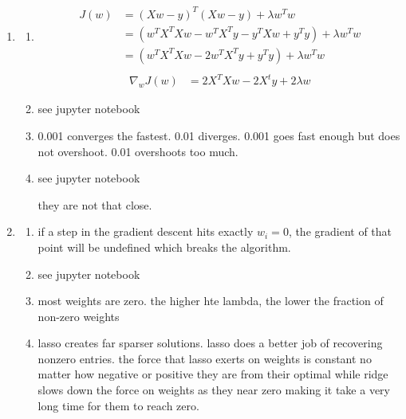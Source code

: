 \documentclass{article}
\begin{document}
\section{}
\begin{enumerate}
    \item 
    \begin{enumerate}
        \item \begin{equation}\begin{split}
            J(w) &= (Xw - y)^T (Xw - y) + {\lambda} w^T w\\
            &=  (w^T X^T X w - w^T X^T y - y^T X w + y^T y) + {\lambda}{} w^T w\\
            &=  (w^T X^T X w - 2w^T X^T y + y^T y) + {\lambda}{} w^T w\\
        \end{split}
        \end{equation}
        \begin{equation}\begin{split}
            \nabla_w J(w)&= 2X^TX w - 2X^ty + 2\lambda w
        \end{split}
        \end{equation}
        \item see jupyter notebook
        \item 0.001 converges the fastest. 0.01 diverges. 0.001 goes fast enough but does not overshoot. 0.01 overshoots too much.
        \item see jupyter notebook

        they are not that close. 
    \end{enumerate}
    \item \begin{enumerate}
        \item if a step in the gradient descent hits exactly \(w_i=0\), the gradient of that point will be undefined which breaks the algorithm.
        \item see jupyter notebook
        \item most weights are zero. the higher hte lambda, the lower the fraction of non-zero weights
        \item lasso creates far sparser solutions. lasso does a better job of recovering nonzero entries. the force that lasso exerts on weights is constant no matter how negative or positive they are from their optimal while ridge slows down the force on weights as they near zero making it take a very long time for them to reach zero. 
    \end{enumerate}
    
\end{enumerate}
\end{document}
